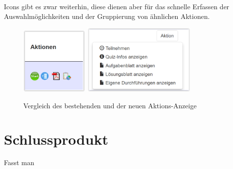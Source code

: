 Icons gibt es zwar weiterhin, diese dienen aber für das schnelle Erfassen der Auswahlmöglichkeiten und der Gruppierung von ähnlichen Aktionen.


\begin{figure}[H]
	\centering
	\includegraphics[width=0.3\textwidth]{Images/Aktionen_alt.PNG}
	\includegraphics[width=0.5\textwidth]{Images/Aktionen_neu.PNG}
	\caption{Vergleich des bestehenden und der neuen Aktions-Anzeige}
	\cite{mobilequiz.ch}
\end{figure}






\section{Schlussprodukt}
Fasst man 

